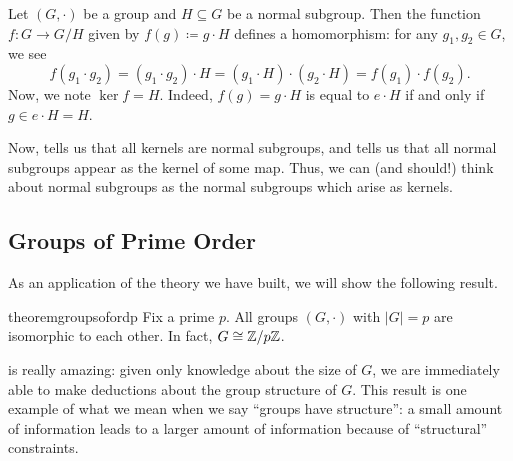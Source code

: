 \documentclass[../notes.tex]{subfiles}
\begin{document}
\begin{example} \label{ex:ker-of-quotient}
    Let $(G,\cdot)$ be a group and $H\subseteq G$ be a normal subgroup. Then the function $f\colon G\to G/H$ given by $f(g)\coloneqq g\cdot H$ defines a homomorphism: for any $g_1,g_2\in G$, we see
    \[f(g_1\cdot g_2)=(g_1\cdot g_2)\cdot H=(g_1\cdot H)\cdot(g_2\cdot H)=f(g_1)\cdot f(g_2).\]
    Now, we note $\ker f=H$. Indeed, $f(g)=g\cdot H$ is equal to $e\cdot H$ if and only if $g\in e\cdot H=H$.
\end{example}
Now,  tells us that all kernels are normal subgroups, and  tells us that all normal subgroups appear as the kernel of some map. Thus, we can (and should!) think about normal subgroups as the normal subgroups which arise as kernels.

\subsection{Groups of Prime Order}
As an application of the theory we have built, we will show the following result.
\begin{restatable}{theorem}{groupsofordp} \label{thm:groups-of-ord-p}
    Fix a prime $p$. All groups $(G,\cdot)$ with $\left|G\right|=p$ are isomorphic to each other. In fact, $G\cong\mathbb Z/p\mathbb Z$.
\end{restatable}
\noindent {} is really amazing: given only knowledge about the size of $G$, we are immediately able to make deductions about the group structure of $G$. This result is one example of what we mean when we say ``groups have structure'': a small amount of information leads to a larger amount of information because of ``structural'' constraints.
\end{document}

